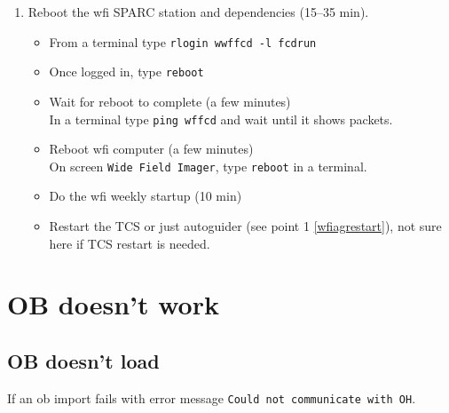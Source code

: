\documentclass[11pt,fleqn,a4paper]{book}
\makeatletter
\def\menu#1#2{\texttt{#1}\ifx{}#2\else\@for\@x:=#2\do{$\rightarrow$\texttt{\@x}}\fi}
\def\wmenu#1#2{window menu \menu{#1}{#2}}
\makeatother
\begin{document}
\begin{enumerate}
\begin{enumerate}
       \item Reactivate the connection between \gls{feros} and TCS
           \begin{itemize}
                \item On the \gls{feros} screen (), locate the \gls{feros} control panel ()
                \item Select \wmenu{Telescope}{ENABLE}
           \end{itemize}
    \end{enumerate}
    \item Reboot the \gls{wfi} SPARC station and dependencies (15--35 min).
    \begin{itemize}
        \item From a terminal type \texttt{rlogin \gls{wwffcd} -l fcdrun}
        \item Once logged in, type \texttt{reboot}
        \item Wait for reboot to complete (a few minutes)\\
              In a terminal type \texttt{ping wffcd} and wait until it shows packets.
        \item Reboot \gls{wfi} computer (a few minutes)\\
              On screen \texttt{Wide Field Imager}, type \texttt{reboot} in a terminal.
        \item Do the \gls{wfi} weekly startup (10 min)
        \item Restart the TCS or just autoguider (see point 1 \ref{wfiagrestart}), not sure here if TCS restart is needed.
    \end{itemize}
\end{enumerate}

\section{OB doesn't work}

\subsection{OB doesn't load}

If an \gls{ob} import fails with error message \texttt{Could not communicate with OH}.
\end{document}
